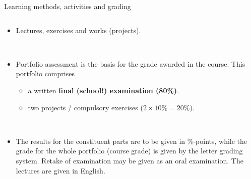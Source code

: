 \documentclass[10pt,ignorenonframetext,]{beamer}
\providecommand{\tightlist}{%
  \setlength{\itemsep}{0pt}\setlength{\parskip}{0pt}}
\begin{document}
\begin{frame}

\begin{block}{Learning methods, activities and grading}

\(~\)

\begin{itemize}
\tightlist
\item
  Lectures, exercises and works (projects).
\end{itemize}

~

\begin{itemize}
\tightlist
\item
  Portfolio assessment is the basis for the grade awarded in the course.
  This portfolio comprises

  \begin{itemize}
  \tightlist
  \item
    a written \textbf{final (school!) examination (80\%)}.
  \item
    two projects / compulsory exercises (\(2\times 10\%=20\%\)).
  \end{itemize}
\end{itemize}

~

\begin{itemize}
\tightlist
\item
  The results for the constituent parts are to be given in \%-points,
  while the grade for the whole portfolio (course grade) is given by the
  letter grading system. Retake of examination may be given as an oral
  examination. The lectures are given in English.
\end{itemize}

\end{block}

\end{frame}
\end{document}

